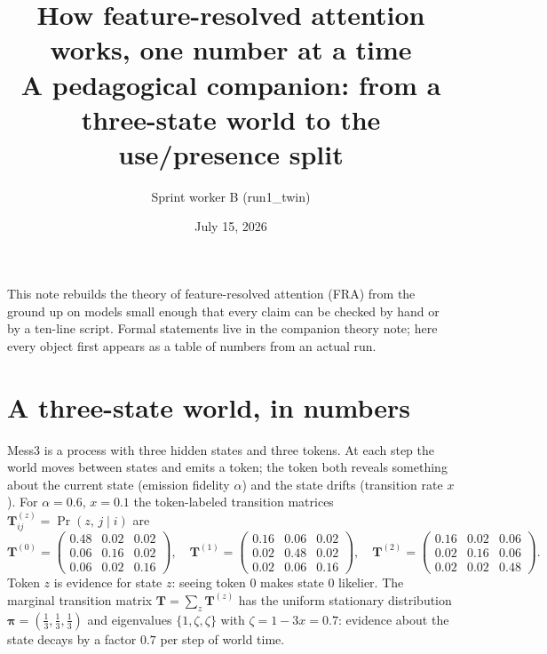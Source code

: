 \documentclass{article}
\title{How feature-resolved attention works, one number at a time\\
\large A pedagogical companion: from a three-state world to the use/presence split}
\author{Sprint worker B (run1\_twin)}
\date{July 15, 2026}
\newcommand{\pib}{\boldsymbol{\pi}}
\newcommand{\Tb}{\boldsymbol{T}}
\newcommand{\Tz}[1]{\Tb^{(#1)}}
\begin{document}
\maketitle

This note rebuilds the theory of feature-resolved attention (FRA) from the
ground up on models small enough that every claim can be checked by hand or
by a ten-line script. Formal statements live in the companion theory note;
here every object first appears as a table of numbers from an actual run.

\section{A three-state world, in numbers}

Mess3 is a process with three hidden states and three tokens. At each step
the world moves between states and emits a token; the token both reveals
something about the current state (emission fidelity $\alpha$) and the state
drifts (transition rate $x$). For $\alpha = 0.6$, $x = 0.1$ the token-labeled
transition matrices $\Tz{z}_{ij} = \Pr(z,\, j \mid i)$ are
\begin{equation*}
\Tz{0} =
\begin{pmatrix}
0.48 & 0.02 & 0.02\\
0.06 & 0.16 & 0.02\\
0.06 & 0.02 & 0.16
\end{pmatrix},
\quad
\Tz{1} =
\begin{pmatrix}
0.16 & 0.06 & 0.02\\
0.02 & 0.48 & 0.02\\
0.02 & 0.06 & 0.16
\end{pmatrix},
\quad
\Tz{2} =
\begin{pmatrix}
0.16 & 0.02 & 0.06\\
0.02 & 0.16 & 0.06\\
0.02 & 0.02 & 0.48
\end{pmatrix}.
\end{equation*}
Token $z$ is evidence for state $z$: seeing token 0 makes state 0 likelier.
The marginal transition matrix $\Tb = \sum_z \Tz{z}$ has the uniform
stationary distribution $\pib = (\tfrac13, \tfrac13, \tfrac13)$ and
eigenvalues $\{1, \zeta, \zeta\}$ with $\zeta = 1 - 3x = 0.7$: evidence
about the state decays by a factor $0.7$ per step of world time.
\end{document}

